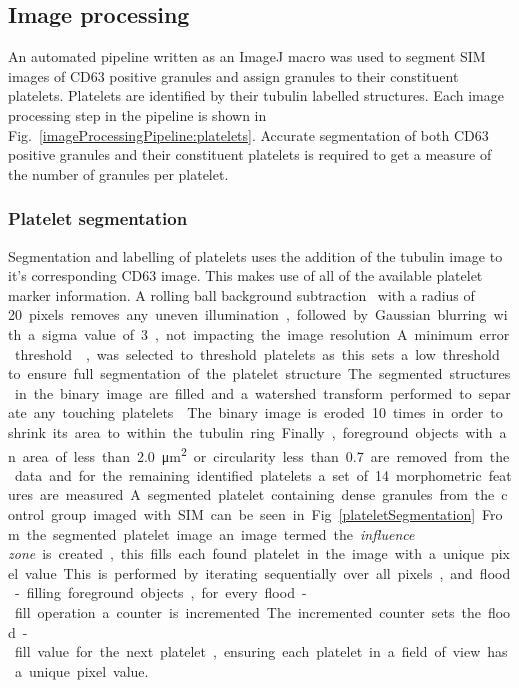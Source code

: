 \subsection{Image processing}
An automated pipeline written as an ImageJ macro was used to segment SIM images of CD63 positive granules and assign granules to their constituent platelets. Platelets are identified by their tubulin labelled structures. Each image processing step in the pipeline is shown in Fig.~\ref{imageProcessingPipeline:platelets}. Accurate segmentation of both CD63 positive granules and their constituent platelets is required to get a measure of the number of granules per platelet.

\subsubsection{Platelet segmentation}
Segmentation and labelling of platelets uses the addition of the tubulin image to it's corresponding CD63 image. This makes use of all of the available platelet marker information. A rolling ball background subtraction~\cite{Sternberg1983} with a radius of \SI{20} pixels removes any uneven illumination, followed by Gaussian blurring with a sigma value of \SI{3}, not impacting the image resolution. A minimum error threshold~\cite{Kittler1986}, was selected to threshold platelets as this sets a low threshold to ensure full segmentation of the platelet structure. The segmented structures in the binary image are filled and a watershed transform performed to separate any touching platelets~\cite{Vincent1991}. The binary image is eroded 10 times in order to shrink its area to within the tubulin ring. Finally, foreground objects with an area of less than \SI{2.0}{\micro\meter\squared} or circularity less than \SI{0.7} are removed from the data and for the remaining identified platelets a set of 14 morphometric features are measured. A segmented platelet containing dense granules from the control group imaged with SIM can be seen in Fig.~\ref{plateletSegmentation}.

From the segmented platelet image an image termed the \emph{influence zone} is created, this fills each found platelet in the image with a unique pixel value. This is performed by iterating sequentially over all pixels, and flood-filling foreground objects, for every flood-fill operation a counter is incremented. The incremented counter sets the flood-fill value for the next platelet, ensuring each platelet in a field of view has a unique pixel value.

